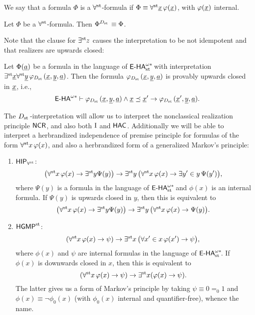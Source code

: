 \begin{dfn}
We say that a formula $\Phi$ is a $\forall^{\operatorname{st}{}}\!$-formula if $\Phi \equiv \forall^{\operatorname{st}{}}\! \underline{x}\,  \varphi (\underline{x})$, with $\varphi (\underline{x})$ internal.
\end{dfn}
\begin{lemma}\label{le:forallst-formulas}
Let $\Phi$ be a $\forall^{\operatorname{st}{}}\!$-formula. Then $\Phi^{\protect{D_{\operatorname{st}{}}}}\equiv \Phi$.
\end{lemma}

Note that the clause for $\exists^{\operatorname{st}{}}\! z$ causes the interpretation to be not idempotent and that realizers are upwards closed:


\begin{lemma} Let $\Phi (\underline{a})$ be a formula in the language of ${\textsf{\upshape E-HA}}^{\omega*}_{\operatorname{st}{}}\!$ with interpretation $\exists^{\operatorname{st}{}}\! \underline{x}\forall^{\operatorname{st}{}}\! \underline{y} \, \varphi_{\protect{D_{\operatorname{st}{}}}} (\underline{x},\underline{y},\underline{a})$. Then the formula $\varphi_{\protect{D_{\operatorname{st}{}}}} (\underline{x},\underline{y},\underline{a})$ is provably upwards closed in $\underline{x}$, i.e.,
\[
          {\textsf{\upshape E-HA}}^{\omega*} \vdash \varphi_{\protect{D_{\operatorname{st}{}}}} (\underline{x},\underline{y},\underline{a}) \land \underline{x} \preceq \underline{x}' \to  \varphi_{\protect{D_{\operatorname{st}{}}}} (\underline{x}',\underline{y},\underline{a}).
\]
\end{lemma}

The $\protect{D_{\operatorname{st}{}}}$-interpretation will allow us to interpret the nonclassical realization principle $\textsf{\upshape NCR}$, and also both $\operatorname{I}$ and ${\textsf{\upshape HAC}}$. Additionally we will be able to interpret a herbrandized independence of premise principle for formulas of the form $\forall^{\operatorname{st}{}}\! x \, \varphi(x)$, and also a herbrandized form of a generalized Markov's principle:
\begin{enumerate}
\item ${\textsf{\upshape HIP}}_{\forall^{\operatorname{st}{}}\!}$:
\[
           \big( \forall^{\operatorname{st}{}}\! x \, \varphi(x) \to\exists^{\operatorname{st}{}}\! y\Psi(y)\big)\rightarrow \exists^{\operatorname{st}{}}\! y \, \big(\forall^{\operatorname{st}{}}\! x \,  \varphi (x)\to \exists y' \in y \, \Psi(y')\big),
            \]
           where $\Psi(y)$ is a formula in the language of ${\textsf{\upshape E-HA}}^{\omega*}_{\operatorname{st}{}}\!$ and $\phi(x)$ is an internal formula. If $\Psi(y)$ is upwards closed in $y$, then this is equivalent to
           \[
        \big( \forall^{\operatorname{st}{}}\! x \, \varphi(x) \to\exists^{\operatorname{st}{}}\! y\Psi(y)\big)\rightarrow \exists^{\operatorname{st}{}}\! y \, \big(\forall^{\operatorname{st}{}}\! x \,  \varphi (x)\to \Psi(y)\big).
\]
\item $\textsf{\upshape HGMP}^{\operatorname{st}}$:
\[
  ( \forall^{\operatorname{st}{}}\! x \, \varphi(x) \to\psi)\to \exists^{\operatorname{st}{}}\! x \, \big(\forall x' \in x\,  \varphi (x')\to\psi\big),
            \]
           where $\phi(x)$ and $\psi$ are internal formulas in the language of ${\textsf{\upshape E-HA}}^{\omega*}_{\operatorname{st}{}}\!$. If $\phi(x)$ is downwards closed in $x$, then this is equivalent to
           \[
       ( \forall^{\operatorname{st}{}}\! x \, \varphi(x) \to\psi)\to \exists^{\operatorname{st}{}}\! x (  \varphi (x)\to\psi).
\]
The latter gives us a form of Markov's principle by taking $\psi \equiv 0=_0 1$ and $\phi (x) \equiv \lnot \phi_0 (x)$ (with $\phi_0(x)$ internal and quantifier-free), whence the name.
\end{enumerate}

